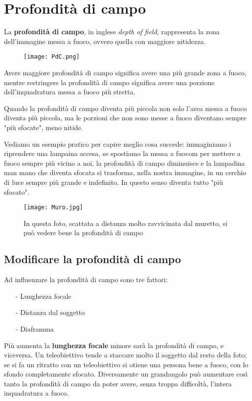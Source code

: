 \section{Profondità di campo} \label{sec:dof}
La \textbf{profondità di campo}, in inglese \textit{depth of field}, rappresenta la zona dell'immagine messa a fuoco, ovvero quella con maggiore nitidezza.

\begin{figure}[h]
    \centering
    \texttt{[image: PdC.png]}
\end{figure}

Avere maggiore profondità di campo significa avere una più grande zona a fuoco, mentre restringere la profondità di campo significa avere una porzione dell'inquadratura messa a fuoco più stretta.

Quando la profondità di campo diventa più piccola non solo l'area messa a fuoco diventa più piccola, ma le porzioni che non sono messe a fuoco diventano sempre "più sfocate", meno nitide.

Vediamo un esempio pratico per capire meglio cosa succede: immaginiamo i riprendere una lampaina accesa, se spostiamo la messa a fuocom per mettere a fuoco sempre più vicino a noi, la profondità di campo diminuisce e la lampadina man mano che diventa sfocata si trasforma, nella nostra immagine, in un cerchio di luce sempre più grande e indefinito. In questo senso diventa tutto "più sfocato".

\begin{figure}[h]
    \texttt{[image: Muro.jpg]}
    \caption{
        In questa foto, scattata a distanza molto ravvicinata dal muretto, si può vedere bene la profondità di campo
    }
\end{figure}

\subsection{Modificare la profondità di campo} \label{subsec:modificadof}
Ad influenzare la profondità di campo sono tre fattori:
\begin{itemize}
    \item[-] Lunghezza focale
    \item[-] Distanza dal soggetto
    \item[-] Diaframma
\end{itemize}

Più aumenta la \textbf{lunghezza focale} minore sarà la profondità di campo, e viceversa.\newline
Un teleobiettivo tende a staccare molto il soggetto dal resto della foto; se si fa un ritratto con un teleobiettivo si otiene una persona bene a fuoco, con lo sfondo completamente sfocato.
Diversamente un grandangolo può aumentare così tanto la profondità di campo da poter avere, senza troppa difficoltà, l'intera inquadratura a fuoco.

